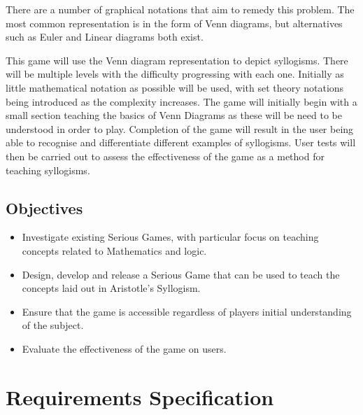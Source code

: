 \documentclass[12pt,a4paper]{report}
\begin{document}
There are a number of graphical notations that aim to remedy this problem. The most common representation is in the form of Venn diagrams, but alternatives such as Euler and Linear diagrams both exist.


This game will use the Venn diagram representation to depict syllogisms.
There will be multiple levels with the difficulty progressing with each one. Initially as little mathematical notation as possible will be used, with set theory notations being introduced as the complexity increases. The game will initially begin with a small section teaching the basics of Venn Diagrams as these will be need to be understood in order to play. Completion of the game will result in the user being able to recognise and differentiate different examples of syllogisms. User tests will then be carried out to assess the effectiveness of the game as a method for teaching syllogisms.

\section{Objectives}
\begin{itemize}
  \item Investigate existing Serious Games, with particular focus on teaching concepts related to Mathematics and logic.

  \item Design, develop and release a Serious Game that can be used to teach the concepts laid out in Aristotle's Syllogism.
  
  \item Ensure that the game is accessible regardless of players initial understanding of the subject.
  \item Evaluate the effectiveness of the game on users.
  
\end{itemize}

\chapter{Requirements Specification}
\end{document}
